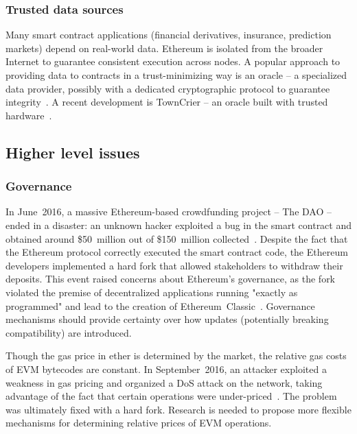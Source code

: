 \subsubsection{Trusted data sources}
Many smart contract applications (financial derivatives, insurance, prediction markets) depend on real-world data.
Ethereum is isolated from the broader Internet to guarantee consistent execution across nodes.
A popular approach to providing data to contracts in a trust-minimizing way is an oracle -- a specialized data provider, possibly with a dedicated cryptographic protocol to guarantee integrity~\cite{Provable}.
A recent development is TownCrier -- an oracle built with trusted hardware~\cite{Zhang2016}.

\subsection{Higher level issues}
\subsubsection{Governance}
In June~2016, a massive Ethereum-based crowdfunding project -- The DAO -- ended in a disaster: an unknown hacker exploited a bug in the smart contract and obtained around \$50~million out of \$150~million collected~\cite{Sirer2016}.
Despite the fact that the Ethereum protocol correctly executed the smart contract code, the Ethereum developers implemented a hard fork that allowed stakeholders to withdraw their deposits.
This event raised concerns about Ethereum's governance, as the fork violated the premise of decentralized applications running "exactly as programmed" and lead to the creation of Ethereum~Classic~\cite{EthereumClassic}.
Governance mechanisms should provide certainty over how updates (potentially breaking compatibility) are introduced.

Though the gas price in ether is determined by the market, the relative gas costs of EVM bytecodes are constant.
In September~2016, an attacker exploited a weakness in gas pricing and organized a DoS attack on the network, taking advantage of the fact that certain operations were under-priced~\cite{EIP150}.
The problem was ultimately fixed with a hard fork.
Research is needed to propose more flexible mechanisms for determining relative prices of EVM operations.


